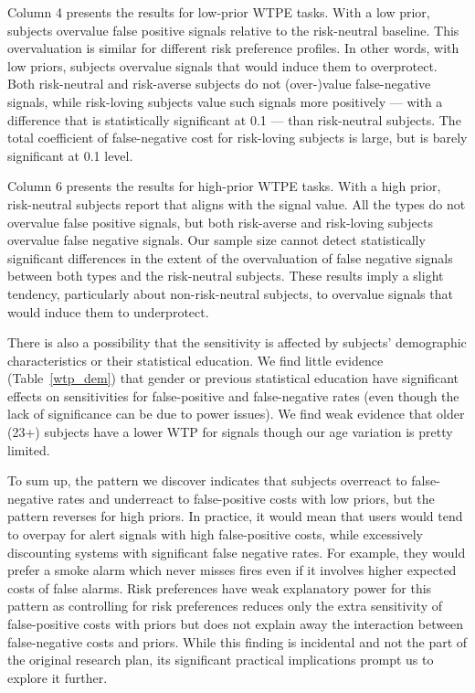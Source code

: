 \documentclass[12pt,a4paper]{article}
\begin{document}
Column 4 presents the results for low-prior WTPE tasks. With a low prior, subjects overvalue false positive signals relative to the risk-neutral baseline. This overvaluation is similar for different risk preference profiles. In other words, with low priors, subjects overvalue signals that would induce them to overprotect. Both risk-neutral and risk-averse subjects do not (over-)value false-negative signals, while risk-loving subjects value such signals more positively --- with a difference that is statistically significant at 0.1 --- than risk-neutral subjects. The total coefficient of false-negative cost for risk-loving subjects is large, but is barely significant at 0.1 level. 

Column 6 presents the results for high-prior WTPE tasks. With a high prior, risk-neutral subjects report that aligns with the signal value. All the types do not overvalue false positive signals, but both risk-averse and risk-loving subjects overvalue false negative signals. Our sample size cannot detect statistically significant differences in the extent of the overvaluation of false negative signals between both types and the risk-neutral subjects. These results imply a slight tendency, particularly about non-risk-neutral subjects, to overvalue signals that would induce them to underprotect.

There is also a possibility that the sensitivity is affected by subjects' demographic characteristics or their statistical education. We find little evidence (Table~\ref{wtp_dem}) that gender or previous statistical education have significant effects on sensitivities for false-positive and false-negative rates (even though the lack of significance can be due to power issues). We find weak evidence that older (23+) subjects have a lower WTP for signals though our age variation is pretty limited.

To sum up, the pattern we discover indicates that subjects overreact to false-negative rates and underreact to false-positive costs with low priors, but the pattern reverses for high priors. In practice, it would mean that users would tend to overpay for alert signals with high false-positive costs, while excessively discounting systems with significant false negative rates. For example, they would prefer a smoke alarm which never misses fires even if it involves higher expected costs of false alarms. Risk preferences have weak explanatory power for this pattern as controlling for risk preferences reduces only the extra sensitivity of false-positive costs with priors but does not explain away the interaction between false-negative costs and priors. While this finding is incidental and not the part of the original research plan, its significant practical implications prompt us to explore it further.
\end{document}
